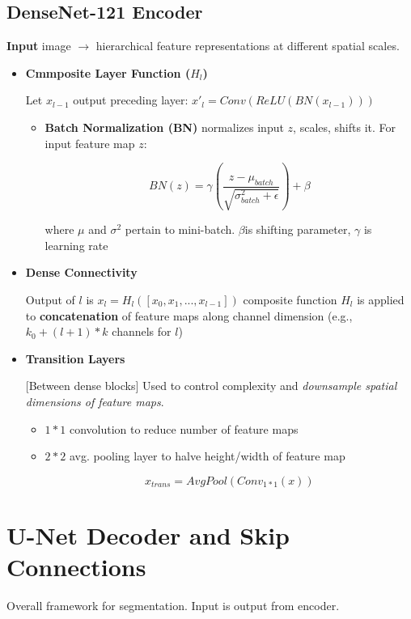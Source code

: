 \documentclass[../main.tex]{subfiles}
\begin{document}
\subsection{DenseNet-121 Encoder} 

\textbf{Input} image $\rightarrow$ hierarchical feature representations at different spatial scales.

\begin{itemize}
    \item \textbf{Cmmposite Layer Function ($H_l$)}

    Let $x_{l-1}$ output preceding layer: $x'_l = Conv(ReLU(BN(x_{l-1})))$
    \begin{itemize}
        \item \textbf{Batch Normalization (BN)} normalizes input $z$, scales, shifts it. For input feature map $z$:

        \[
            BN(z) = \gamma (\frac{z-\mu_{batch}}{\sqrt{\sigma^2_{batch}+\epsilon}}) + \beta
        \]

        where $\mu$ and $\sigma^2$ pertain to mini-batch. $\beta$is shifting parameter, $\gamma$ is learning rate
    \end{itemize}
    \item \textbf{Dense Connectivity}
    
    Output of $l$ is $x_l = H_l([x_0,x_1,...,x_{l-1}])$ composite function $H_l$ is applied to \textbf{concatenation} of feature maps along channel dimension (e.g., $k_0 + (l+1) * k$ channels for $l$)

    \item \textbf{Transition Layers} 

    [Between dense blocks] Used to control complexity and \textit{downsample spatial dimensions of feature maps}.
    \begin{itemize}
        \item $1*1$ convolution to reduce number of feature maps
        \item $2*2$ avg. pooling layer to halve height/width of feature map

        \[
        x_{trans}=AvgPool(Conv_{1*1}(x))
        \]
    
    \end{itemize}
    
\end{itemize}

\section{U-Net Decoder and Skip Connections}
Overall framework for segmentation. Input is output from encoder. 
\end{document}
